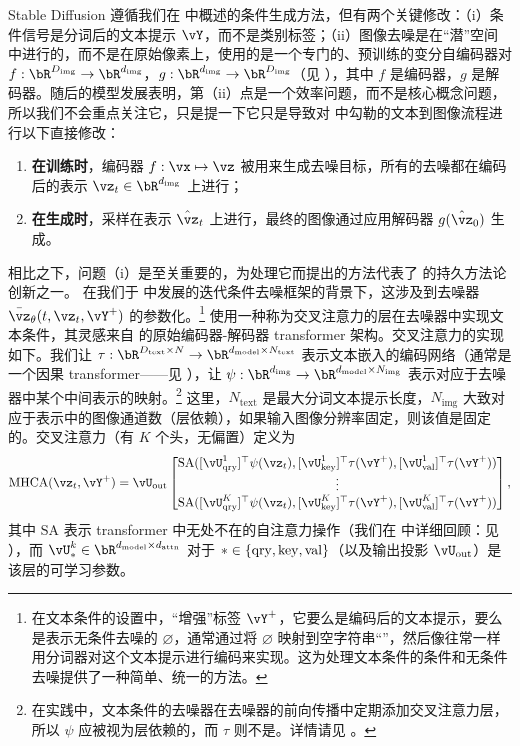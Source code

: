 \documentclass[../../book-main.tex]{subfiles}
\begin{document}
Stable Diffusion 遵循我们在  中概述的条件生成方法，但有两个关键修改：（i）条件信号是分词后的文本提示 $\vY$，而不是类别标签；（ii）图像去噪是在“潜”空间中进行的，而不是在原始像素上，使用的是一个专门的、预训练的变分自编码器对 $f : \bR^{D_{\mathrm{img}}} \to \bR^{d_{\mathrm{img}}}$，$g : \bR^{d_{\mathrm{img}}} \to \bR^{D_{\mathrm{img}}}$（见 ），其中 $f$ 是编码器，$g$ 是解码器。随后的模型发展表明，第（ii）点是一个效率问题，而不是核心概念问题，所以我们不会重点关注它，只是提一下它只是导致对  中勾勒的文本到图像流程进行以下直接修改：
\begin{enumerate}
  \item \textbf{在训练时}，编码器 $f : \vx \mapsto \vz$ 被用来生成去噪目标，所有的去噪都在编码后的表示 $\vz_t \in \bR^{d_{\mathrm{img}}}$ 上进行；
  \item \textbf{在生成时}，采样在表示 $\hat{\vz}_t$ 上进行，最终的图像通过应用解码器 $g(\hat{\vz}_0)$ 生成。
\end{enumerate}
相比之下，问题（i）是至关重要的，为处理它而提出的方法代表了 \textcite{rombach2022high} 的持久方法论创新之一。
在我们于  中发展的迭代条件去噪框架的背景下，这涉及到去噪器 $\bar{\vz}_{\theta}(t, \vz_t, \vY^+)$ 的参数化。\footnote{在文本条件的设置中，“增强”标签 $\vY^+$，它要么是编码后的文本提示，要么是表示无条件去噪的 $\varnothing$，通常通过将 $\varnothing$ 映射到空字符串“”，然后像往常一样用分词器对这个文本提示进行编码来实现。这为处理文本条件的条件和无条件去噪提供了一种简单、统一的方法。}
\textcite{rombach2022high} 使用一种称为交叉注意力的层在去噪器中实现文本条件，其灵感来自 \textcite{vaswani2017attention} 的原始编码器-解码器 transformer 架构。交叉注意力的实现如下。我们让 $\tau : \bR^{D_{\mathrm{text}} \times N} \to \bR^{d_{\mathrm{model}} \times N_{\mathrm{text}}}$ 表示文本嵌入的编码网络（通常是一个因果 transformer——见 ），让 $\psi : \bR^{d_{\mathrm{img}}} \to \bR^{d_{\mathrm{model}} \times N_{\mathrm{img}}}$ 表示对应于去噪器中某个中间表示的映射。\footnote{在实践中，文本条件的去噪器在去噪器的前向传播中定期添加交叉注意力层，所以 $\psi$ 应被视为层依赖的，而 $\tau$ 则不是。详情请见 \textcite{rombach2022high}。} 这里，$N_{\mathrm{text}}$ 是最大分词文本提示长度，$N_{\mathrm{img}}$ 大致对应于表示中的图像通道数（层依赖），如果输入图像分辨率固定，则该值是固定的。交叉注意力（有 $K$ 个头，无偏置）定义为
    \begin{equation}
      \mathrm{MHCA}(\vz_t, \vY^+) \label{eq:mhca}
        = \vU_{\out}\mat{\SA([\vU_{\query}^{1}]^{\top}\psi(\vz_t),
        [\vU_{\rm key}^{1}]^{\top}\tau(\vY^+), [\vU_{\val}^{1}]^{\top}\tau(\vY^+)) \\ \vdots \\
        \SA([\vU_{\query}^{K}]^{\top}\psi(\vz_t),
        [\vU_{\rm key}^{K}]^{\top}\tau(\vY^+),
        [\vU_{\val}^{K}]^{\top}\tau(\vY^+))},
    \end{equation}
其中 $\mathrm{SA}$ 表示 transformer 中无处不在的自注意力操作（我们在  中详细回顾：见 ），而 $\vU_{*}^{k} \in \bR^{d_{\mathrm{model}}\times d_{\mathrm{attn}} }$ 对于 $* \in \set{\mathrm{qry}, \mathrm{key}, \mathrm{val}}$（以及输出投影 $\vU_{\mathrm{out}}$）是该层的可学习参数。
\end{document}
